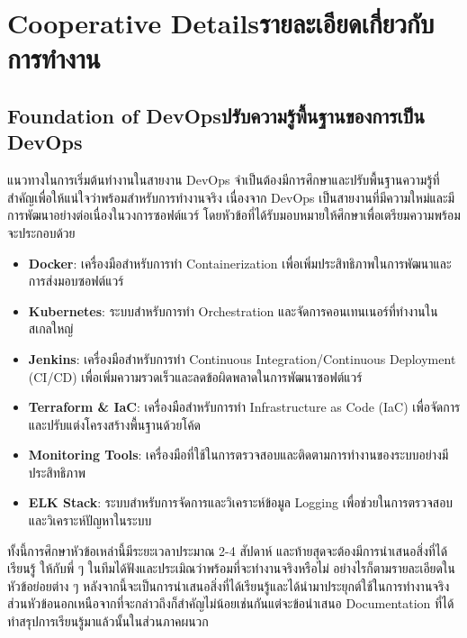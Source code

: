 

\setcounter{secnumdepth}{3}

\chapter{\ifenglish Cooperative Details\else รายละเอียดเกี่ยวกับการทำงาน\fi}


\section{\ifenglish Foundation of DevOps\else ปรับความรู้พื้นฐานของการเป็น DevOps\fi}
แนวทางในการเริ่มต้นทำงานในสายงาน DevOps จำเป็นต้องมีการศึกษาและปรับพื้นฐานความรู้ที่สำคัญเพื่อให้แน่ใจว่าพร้อมสำหรับการทำงานจริง
เนื่องจาก DevOps เป็นสายงานที่มีความใหม่และมีการพัฒนาอย่างต่อเนื่องในวงการซอฟต์แวร์ โดยหัวข้อที่ได้รับมอบหมายให้ศึกษาเพื่อเตรียมความพร้อมจะประกอบด้วย

\begin{itemize}
      \item \textbf{Docker}: เครื่องมือสำหรับการทำ Containerization เพื่อเพิ่มประสิทธิภาพในการพัฒนาและการส่งมอบซอฟต์แวร์
      \item \textbf{Kubernetes}: ระบบสำหรับการทำ Orchestration และจัดการคอนเทนเนอร์ที่ทำงานในสเกลใหญ่
      \item \textbf{Jenkins}: เครื่องมือสำหรับการทำ Continuous Integration/Continuous Deployment (CI/CD) เพื่อเพิ่มความรวดเร็วและลดข้อผิดพลาดในการพัฒนาซอฟต์แวร์
      \item \textbf{Terraform \& IaC}: เครื่องมือสำหรับการทำ Infrastructure as Code (IaC) เพื่อจัดการและปรับแต่งโครงสร้างพื้นฐานด้วยโค้ด
      \item \textbf{Monitoring Tools}: เครื่องมือที่ใช้ในการตรวจสอบและติดตามการทำงานของระบบอย่างมีประสิทธิภาพ
      \item \textbf{ELK Stack}: ระบบสำหรับการจัดการและวิเคราะห์ข้อมูล Logging เพื่อช่วยในการตรวจสอบและวิเคราะห์ปัญหาในระบบ
\end{itemize}

ทั้งนี้การศึกษาหัวข้อเหล่านี้มีระยะเวลาประมาณ 2-4 สัปดาห์ และท้ายสุดจะต้องมีการนำเสนอสิ่งที่ได้เรียนรู้
ให้กับพี่ ๆ ในทีมได้ฟังและประเมิณว่าพร้อมที่จะทำงานจริงหรือไม่ อย่างไรก็ตามรายละเอียดในหัวข้อย่อยต่าง ๆ หลังจากนี้จะเป็นการนำเสนอสิ่งที่ได้เรียนรู้และได้นำมาประยุกต์ใช้ในการทำงานจริง
ส่วนหัวข้อนอกเหนือจากที่จะกล่าวถึงก็สำคัญไม่น้อยเช่นกันแต่จะข้อนำเสนอ Documentation ที่ได้ทำสรุปการเรียนรู้มาแล้วนั้นในส่วนภาคผนวก

